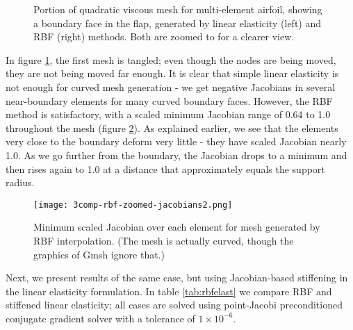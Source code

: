  
 \begin{figure}
 	\centering
 	\caption{Portion of quadratic viscous mesh for multi-element airfoil, showing a boundary face in the flap, generated by linear elasticity (left) and RBF (right) methods. Both are zoomed to for a clearer view.}
 	\label{fig:tangled2}
 \end{figure}
 
 In figure \ref{fig:tangled2}, the first mesh is tangled; even though the nodes are being moved, they are not being moved far enough. It is clear that simple linear elasticity is not enough for curved mesh generation - we get negative Jacobians in several near-boundary elements for many curved boundary faces. However, the RBF method is satisfactory, with a scaled minimum Jacobian range of 0.64 to 1.0 throughout the mesh (figure \ref{fig:rbf-jacobians}). As explained earlier, we see that the elements very close to the boundary deform very little - they have scaled Jacobian nearly 1.0. As we go further from the boundary, the Jacobian drops to a minimum and then rises again to 1.0 at a distance that approximately equals the support radius.
 
 \begin{figure}
 	\centering
 	\texttt{[image: 3comp-rbf-zoomed-jacobians2.png]}
 	\caption{Minimum scaled Jacobian over each element for mesh generated by RBF interpolation. (The mesh is actually curved, though the graphics of Gmsh ignore that.)}
 	\label{fig:rbf-jacobians}
 \end{figure}

Next, we present results of the same case, but using Jacobian-based stiffening in the linear elasticity formulation. In table \ref{tab:rbfelast} we compare RBF and stiffened linear elasticity; all cases are solved using point-Jacobi preconditioned conjugate gradient solver with a tolerance of $1\times 10^{-6}$.

